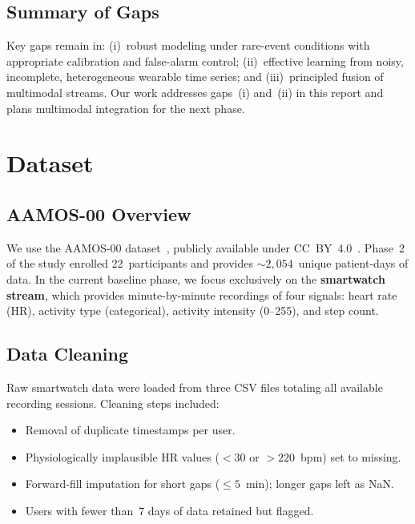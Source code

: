 \documentclass[11pt,a4paper]{article}
\begin{document}
\subsection{Summary of Gaps}

Key gaps remain in: (i)~robust modeling under rare-event conditions with
appropriate calibration and false-alarm control; (ii)~effective learning from
noisy, incomplete, heterogeneous wearable time series; and (iii)~principled
fusion of multimodal streams.  Our work addresses gaps~(i) and~(ii) in this
report and plans multimodal integration for the next phase.

\section{Dataset}\label{sec:dataset}

\subsection{AAMOS-00 Overview}

We use the AAMOS-00 dataset~\cite{tsang2023}, publicly available under
CC~BY~4.0~\cite{datashare}.  Phase~2 of the study enrolled 22~participants and
provides ${\sim}2{,}054$~unique patient-days of data.  In the current baseline
phase, we focus exclusively on the \textbf{smartwatch stream}, which provides
minute-by-minute recordings of four signals: heart rate (HR), activity type
(categorical), activity intensity (0--255), and step count.

\subsection{Data Cleaning}

Raw smartwatch data were loaded from three CSV files totaling all available
recording sessions.  Cleaning steps included:

\begin{itemize}[nosep]
  \item Removal of duplicate timestamps per user.
  \item Physiologically implausible HR values (${<}30$ or ${>}220$~bpm) set to
        missing.
  \item Forward-fill imputation for short gaps (${\leq}5$~min); longer gaps
        left as NaN.
  \item Users with fewer than~7 days of data retained but flagged.
\end{itemize}
\end{document}
